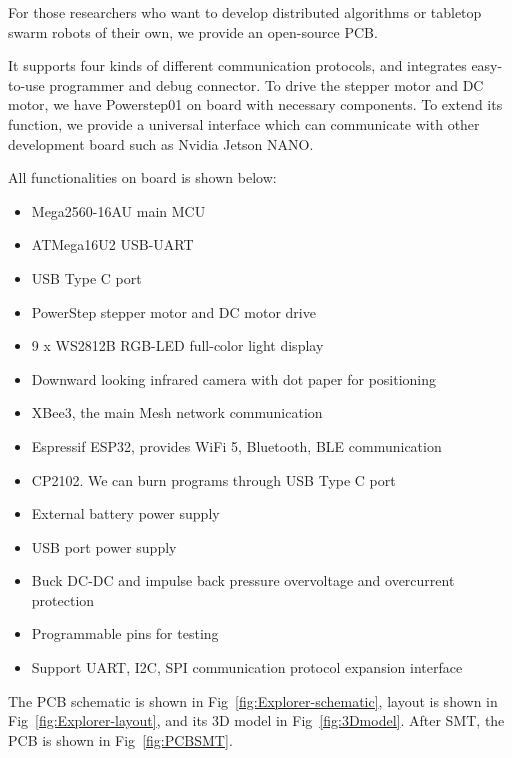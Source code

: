 \documentclass[sigconf]{acmart}
\begin{document}
For those researchers who want to develop distributed algorithms or tabletop swarm robots of their own, we provide an open-source PCB. 

It supports four kinds of different communication protocols, and integrates easy-to-use programmer and debug connector. To drive the stepper motor and DC motor, we have Powerstep01 on board with necessary components.
To extend its function, we provide a universal interface which can communicate with other development board such as Nvidia Jetson NANO.

All functionalities on board is shown below:

\begin{itemize}
  \item Mega2560-16AU main MCU
  \item ATMega16U2 USB-UART
  \item USB Type C port
  \item PowerStep stepper motor and DC motor drive
  \item 9 x WS2812B RGB-LED full-color light display
  \item Downward looking infrared camera with dot paper for positioning
  \item XBee3, the main Mesh network communication
  \item Espressif ESP32, provides WiFi 5, Bluetooth, BLE communication
  \item CP2102. We can burn programs through USB Type C port
  \item External battery power supply
  \item USB port power supply
  \item Buck DC-DC and impulse back pressure overvoltage and overcurrent protection
  \item Programmable pins for testing
  \item Support UART, I2C, SPI communication protocol expansion interface
\end{itemize}

The PCB schematic is shown in Fig~\ref{fig:Explorer-schematic}, layout is shown in Fig~\ref{fig:Explorer-layout}, and its 3D model in Fig~\ref{fig:3Dmodel}. After SMT, the PCB is shown in Fig~\ref{fig:PCBSMT}.
\end{document}
